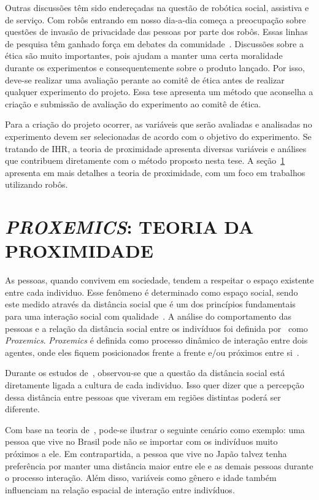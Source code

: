 Outras discussões têm sido endereçadas na questão de robótica social, assistiva e de serviço. Com robôs entrando em nosso dia-a-dia começa a preocupação sobre questões de invasão de privacidade das pessoas por parte dos robôs. Essas linhas de pesquisa têm ganhado força em debates da comunidade~\cite{rueben:2017}. Discussões sobre a ética são muito importantes, pois ajudam a manter uma certa moralidade durante os experimentos e consequentemente sobre o produto lançado. Por isso, deve-se realizar uma avaliação perante ao comitê de ética antes de realizar qualquer experimento do projeto. Essa tese apresenta um método que aconselha a criação e submissão de avaliação do experimento ao comitê de ética.

Para a criação do projeto ocorrer, as variáveis que serão avaliadas e analisadas no experimento devem ser selecionadas de acordo com o objetivo do experimento. Se tratando de IHR, a teoria de proximidade apresenta diversas variáveis e análises que contribuem diretamente com o método proposto nesta tese. A seção~\ref{sec:proxemics} apresenta em mais detalhes a teoria de proximidade, com um foco em trabalhos utilizando robôs.

\section{\emph{PROXEMICS}: TEORIA DA PROXIMIDADE}
\label{sec:proxemics}
As pessoas, quando convivem em sociedade, tendem a respeitar o espaço existente entre cada individuo. Esse fenômeno é determinado como espaço social, sendo este medido através da distância social que é um dos princípios fundamentais para uma interação social com qualidade~\cite{hall:1969, henkel:2014}. A análise do comportamento das pessoas e a relação da distância social entre os indivíduos foi definida por~\textcite{hall:1969} como \emph{Proxemics}. \emph{Proxemics} é definida como processo dinâmico de interação entre dois agentes, onde eles fiquem posicionados frente a frente e/ou próximos entre si~\cite{mead:2011b}.

Durante os estudos de~\textcite{hall:1969}, observou-se que a questão da distância social está diretamente ligada a cultura de cada individuo. Isso quer dizer que a percepção dessa distância entre pessoas que viveram em regiões distintas poderá ser diferente.

Com base na teoria de~\textcite{hall:1969}, pode-se ilustrar o seguinte cenário como exemplo: uma pessoa que vive no Brasil pode não se importar com os indivíduos muito próximos a ele. Em contrapartida, a pessoa que vive no Japão talvez tenha preferência por manter uma distância maior entre ele e as demais pessoas durante o processo interação. Além disso, variáveis como gênero e idade também influenciam na relação espacial de interação entre indivíduos.

